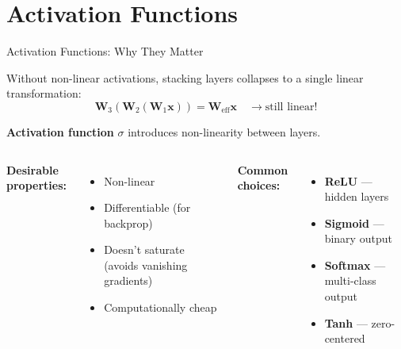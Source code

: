 \documentclass[aspectratio=169]{beamer}
\begin{document}
\section{Activation Functions}

\begin{frame}{Activation Functions: Why They Matter}

Without non-linear activations, stacking layers collapses to a single linear transformation:
\[
\mathbf{W}_3(\mathbf{W}_2(\mathbf{W}_1\mathbf{x})) = \mathbf{W}_{\text{eff}}\mathbf{x} \quad \longrightarrow \text{still linear!}
\]

\vspace{0.3cm}
\textbf{Activation function} $\sigma$ introduces non-linearity between layers.

\vspace{0.3cm}
\begin{columns}
\textbf{Desirable properties:}
\begin{itemize}
    \item Non-linear
    \item Differentiable (for backprop)
    \item Doesn't saturate (avoids vanishing gradients)
    \item Computationally cheap
\end{itemize}

\textbf{Common choices:}
\begin{itemize}
    \item \textbf{ReLU} --- hidden layers
    \item \textbf{Sigmoid} --- binary output
    \item \textbf{Softmax} --- multi-class output
    \item \textbf{Tanh} --- zero-centered
\end{itemize}
\end{columns}
\end{frame}
\end{document}
